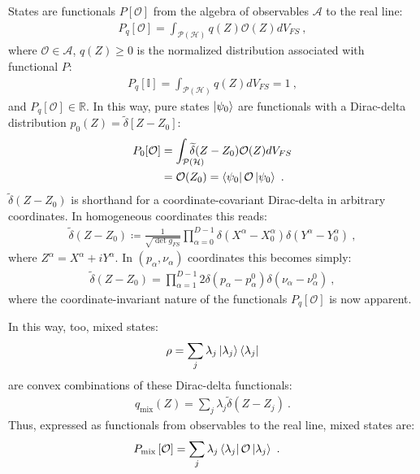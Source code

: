 \documentclass[draft,nofootinbib,pre,twocolumn,showpacs,showkeys,preprintnumbers,floatfix]{revtex4-1}
\newcommand{\1}{\mathbbm{1}}
\newcommand{\intP}{\int_{\mathcal{P}(\mathcal{H})} \!\!\!\!\!\!\!\!\!}
\begin{document}
States are functionals $P[\mathcal{O}]$ from the algebra of
observables $\mathcal{A}$ to the real line: 
\begin{align}
P_q[\mathcal{O}]
  = \int_{\mathcal{P}(\mathcal{H})} q(Z) \mathcal{O}(Z) dV_{FS}
  ~,
\label{eq:gqs}
\end{align}
where $\mathcal{O} \in \mathcal{A}$, $q(Z) \geq 0$ is the
normalized distribution associated with functional $P$:
\begin{align*}
P_q[\mathbb{I}] = \int_{\mathcal{P}(\mathcal{H})}
  q(Z) dV_{FS}  = 1
  ~,
\end{align*}
and $P_q[\mathcal{O}] \in \mathbb{R}$. 
In this way, pure states $\ket{\psi_0}$ are functionals with a Dirac-delta
distribution $p_0(Z) = \widetilde{\delta}\left[ Z - Z_0\right]$:
\begin{align*}
P_{0}[\mathcal{O}] &= \intP \widetilde{\delta}(Z-Z_0)\mathcal{O}(Z) dV_{FS} \\
  & = \mathcal{O}(Z_0)  = \bra{\psi_0}\mathcal{O}\ket{\psi_0}
  ~.
\end{align*}
$\widetilde{\delta}(Z-Z_0)$ is shorthand for a coordinate-covariant Dirac-delta in
arbitrary coordinates. In homogeneous coordinates this reads:
\begin{align*}
\widetilde{\delta}(Z - Z_0) \coloneqq \frac{1}{\sqrt{\det g_{FS}}}
  \prod_{\alpha=0}^{D-1} \delta(X^\alpha - X^\alpha_0)
  \delta(Y^\alpha - Y^\alpha_0)
  ~,
\end{align*}
where $Z^\alpha = X^\alpha + iY^\alpha$. In $(p_\alpha,\nu_\alpha)$ coordinates
this becomes simply:
\begin{align*}
\widetilde{\delta}(Z - Z_0) = \prod_{\alpha=1}^{D-1} 2\delta(p_\alpha - p_\alpha^0) \delta(\nu_\alpha - \nu_\alpha^0)
  ~,
\end{align*}
where the coordinate-invariant nature of the functionals $P_q[\mathcal{O}]$ is
now apparent.

In this way, too, mixed states:
\begin{align*}
\rho = \sum_{j}\lambda_j \ket{\lambda_j}\bra{\lambda_j}
\end{align*}
are convex combinations of these Dirac-delta functionals:
\begin{align*}
q_{\mathrm{mix}}(Z) = \sum_{j}\lambda_j \widetilde{\delta}(Z-Z_j)
  ~. 
\end{align*}
Thus, expressed as functionals from observables to the real line, mixed states
are:
\begin{align}
P_{\mathrm{mix}}\left[ \mathcal{O}\right]
  & = \sum_{j} \lambda_j \bra{\lambda_j}\mathcal{O}\ket{\lambda_j}
  ~.
\label{eq:Functional}
\end{align}
\end{document}
